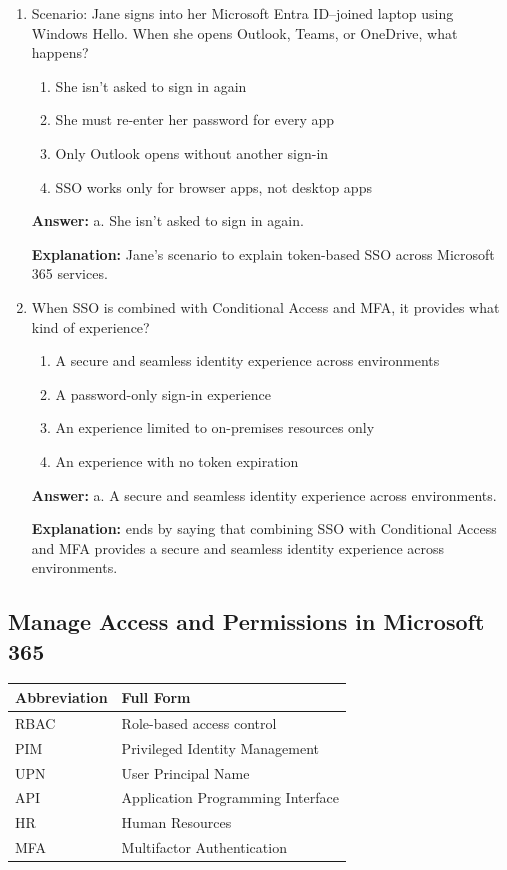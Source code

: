 \documentclass[10pt]{article}
\begin{document}
\begin{enumerate}[leftmargin=*]
\item Scenario: Jane signs into her Microsoft Entra ID–joined laptop using Windows Hello. When she opens Outlook, Teams, or OneDrive, what happens?
\begin{enumerate}[label=\alph*., leftmargin=1.5em]
\item She isn’t asked to sign in again
\item She must re-enter her password for every app
\item Only Outlook opens without another sign-in
\item SSO works only for browser apps, not desktop apps
\end{enumerate}
\textbf{Answer:} a. She isn’t asked to sign in again.

\textbf{Explanation:} Jane’s scenario to explain token-based SSO across Microsoft 365 services.

\item When SSO is combined with Conditional Access and MFA, it provides what kind of experience?
\begin{enumerate}[label=\alph*., leftmargin=1.5em]
\item A secure and seamless identity experience across environments
\item A password-only sign-in experience
\item An experience limited to on-premises resources only
\item An experience with no token expiration
\end{enumerate}
\textbf{Answer:} a. A secure and seamless identity experience across environments.

\textbf{Explanation:} ends by saying that combining SSO with Conditional Access and MFA provides a secure and seamless identity experience across environments.

\end{enumerate}
\clearpage

\subsection{Manage Access and Permissions in Microsoft 365}

\begin{center}
\begin{tabular}{>{\raggedright\arraybackslash}p{} >{\raggedright\arraybackslash}p{}}
\toprule
\textbf{Abbreviation} & \textbf{Full Form} \\
\midrule
RBAC & Role-based access control \\
PIM & Privileged Identity Management \\
UPN & User Principal Name \\
API & Application Programming Interface \\
HR & Human Resources \\
MFA & Multifactor Authentication \\
\bottomrule
\end{tabular}
\end{center}
\end{document}
